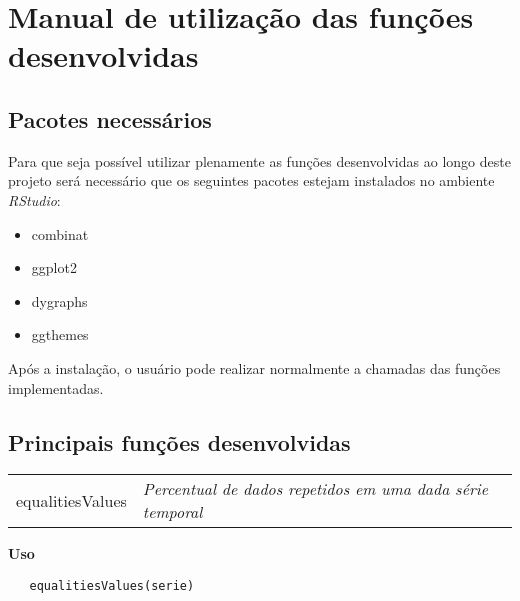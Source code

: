 \chapter{Manual de utilização das funções desenvolvidas} \label{apendiceA}

\section{Pacotes necessários}

Para que seja possível utilizar plenamente as funções desenvolvidas ao longo deste projeto será necessário que os seguintes pacotes estejam instalados no ambiente \textit{RStudio}:

\begin{itemize}
\item combinat
\item ggplot2
\item dygraphs
\item ggthemes
\end{itemize}

Após a instalação, o usuário pode realizar normalmente a chamadas das funções implementadas.

\section{Principais funções desenvolvidas}


\hrulefill   

\begin{table}[!ht]
\begin{center}
\begin{tabularx}{\textwidth}{ X X}
\hspace{0.5cm} equalitiesValues & \textit{Percentual de dados repetidos em uma dada série temporal}\\
\end{tabularx}
\end{center}
\end{table} 

\vspace{-0.5cm}

\hrulefill  

\vspace{0.5cm}

\textbf{Uso}

\begin{lstlisting}
   equalitiesValues(serie)
\end{lstlisting}

